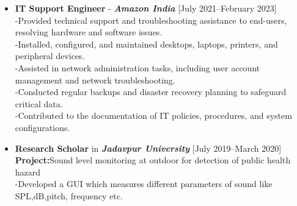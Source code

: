 \documentclass[11pt,a4paper]{moderncv}
\begin{document}
\begin{itemize}
	
	\item \textbf{IT Support Engineer} - \textit{\textbf{Amazon India}} \hfill [July 2021--February 2023]\\	
	-Provided technical support and troubleshooting assistance to end-users, resolving hardware and software issues.\\
	-Installed, configured, and maintained desktops, laptops, printers, and peripheral devices.\\
	-Assisted in network administration tasks, including user account management and network troubleshooting.\\
	-Conducted regular backups and disaster recovery planning to safeguard critical data.\\
	-Contributed to the documentation of IT policies, procedures, and system configurations.
	
		
	
	\item \textbf{Research Scholar} in \textit{\textbf{Jadavpur University}} \hfill [July 2019--March 2020]\\
	\textbf{Project:}Sound level monitoring at
	outdoor for detection of public health hazard\\
	-Developed a GUI which measures different parameters of sound like
	SPL,dB,pitch, frequency etc.
	

\end{itemize}
\end{document}
